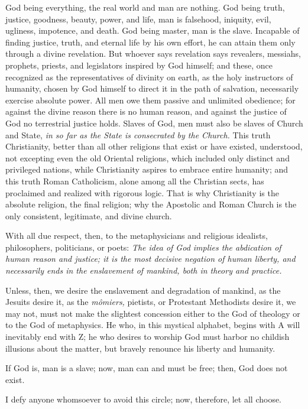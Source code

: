 \documentclass[12pt]{report}
\begin{document}
God being everything, the real world and man are nothing. God being truth, justice, goodness, beauty, power, and life, man is falsehood, iniquity, evil, ugliness, impotence, and death. God being master, man is the slave. Incapable of finding justice, truth, and eternal life by his own effort, he can attain them only through a divine revelation. But whoever says revelation says revealers, messiahs, prophets, priests, and legislators inspired by God himself; and these, once recognized as the representatives of divinity on earth, as the holy instructors of humanity, chosen by God himself to direct it in the path of salvation, necessarily exercise absolute power. All men owe them passive and unlimited obedience; for against the divine reason there is no human reason, and against the justice of God no terrestrial justice holds. Slaves of God, men must also be slaves of Church and State, \emph{in so far as the State is consecrated by the Church.} This truth Christianity, better than all other religions that exist or have existed, understood, not excepting even the old Oriental religions, which included only distinct and privileged nations, while Christianity aspires to embrace entire humanity; and this truth Roman Catholicism, alone among all the Christian sects, has proclaimed and realized with rigorous logic. That is why Christianity is the absolute religion, the final religion; why the Apostolic and Roman Church is the only consistent, legitimate, and divine church.


With all due respect, then, to the metaphysicians and religious idealists, philosophers, politicians, or poets: \emph{The idea of God implies the abdication of human reason and justice; it is the most decisive negation of human liberty, and necessarily ends in the enslavement of mankind, both in theory and practice.}


Unless, then, we desire the enslavement and degradation of mankind, as the Jesuits desire it, as the \emph{mômiers,} pietists, or Protestant Methodists desire it, we may not, must not make the slightest concession either to the God of theology or to the God of metaphysics. He who, in this mystical alphabet, begins with A will inevitably end with Z; he who desires to worship God must harbor no childish illusions about the matter, but bravely renounce his liberty and humanity.


If God is, man is a slave; now, man can and must be free; then, God does not exist.


I defy anyone whomsoever to avoid this circle; now, therefore, let all choose.
\end{document}
